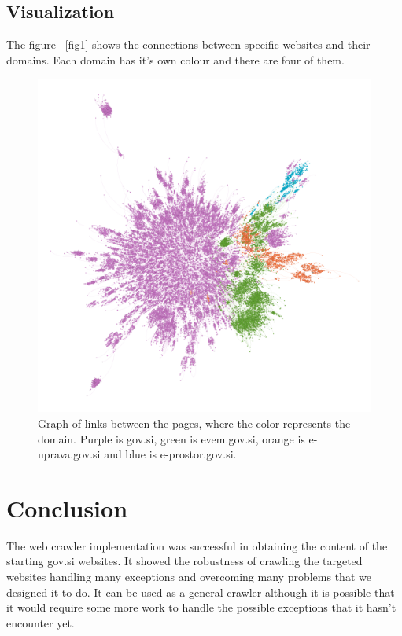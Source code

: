 \documentclass[9pt]{IEEEtran}
\begin{document}
\subsection{Visualization}

The figure ~\ref{fig1} shows the connections between specific websites and their domains.
Each domain has it's own colour and there are four of them.
 
\begin{figure}[h]
    \centering
    \includegraphics[width=1\columnwidth]{data.png}
    \caption{Graph of links between the pages, where the color represents the domain. Purple is gov.si, green is evem.gov.si, orange is e-uprava.gov.si and blue is e-prostor.gov.si.}
    \label{fig:office}
\end{figure}

\section{Conclusion}

The web crawler implementation was successful in obtaining the content of the starting gov.si websites.
It showed the robustness of crawling the targeted websites handling many exceptions and overcoming many problems that we designed it to do.
It can be used as a general crawler although it is possible that it would require some more work to handle the possible exceptions that it hasn't encounter yet.


%
\end{document}
